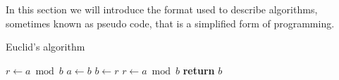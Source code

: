 \myindent In this section we will introduce the format used to describe algorithms, sometimes known as pseudo code, that is a simplified form of programming. 

\begin{algorithm}
    \caption{Euclid’s algorithm}
    \label{euclid}
    \begin{algorithmic}[1] %
         
            \State $r\gets a \bmod b$
             
                \State $a \gets b$
                \State $b \gets r$
                \State $r \gets a \bmod b$
            \EndWhile\label{euclidendwhile}
            \State \textbf{return} $b$
        \EndProcedure
    \end{algorithmic}
\end{algorithm}

